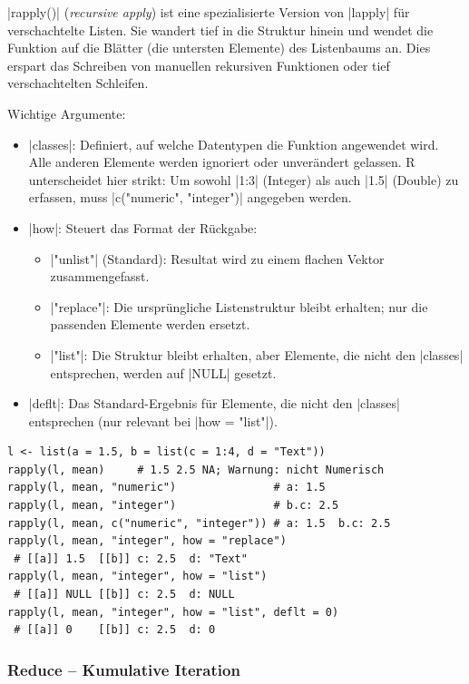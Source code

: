 \documentclass[10pt,twocolumn]{scrartcl}
\renewcommand{\lstinline}{\mycoloredinline}
\begin{document}
\lstinline|rapply()| (\emph{recursive apply}) ist eine spezialisierte Version von \lstinline|lapply| für verschachtelte Listen. Sie wandert tief in die Struktur hinein und wendet die Funktion auf die Blätter (die untersten Elemente) des Listenbaums an. Dies erspart das Schreiben von manuellen rekursiven Funktionen oder tief verschachtelten Schleifen.

Wichtige Argumente:

\begin{itemize}
\item \lstinline|classes|: Definiert, auf welche Datentypen die Funktion angewendet wird. Alle anderen Elemente werden ignoriert oder unverändert gelassen. R unterscheidet hier strikt: Um sowohl \lstinline|1:3| (Integer) als auch \lstinline|1.5| (Double) zu erfassen, muss \lstinline|c("numeric", "integer")| angegeben werden.
\item \lstinline|how|: Steuert das Format der Rückgabe:
  \begin{itemize}
  \item \lstinline|"unlist"| (Standard): Resultat wird zu einem flachen Vektor zusammengefasst.
  \item \lstinline|"replace"|: Die ursprüngliche Listenstruktur bleibt erhalten; nur die passenden Elemente werden ersetzt.
  \item \lstinline|"list"|: Die Struktur bleibt erhalten, aber Elemente, die nicht den \lstinline|classes| entsprechen, werden auf \lstinline|NULL| gesetzt.
  \end{itemize}
\item \lstinline|deflt|: Das Standard-Ergebnis für Elemente, die nicht den \lstinline|classes| entsprechen (nur relevant bei \lstinline|how = "list"|).
\end{itemize}

\begin{lstlisting}
l <- list(a = 1.5, b = list(c = 1:4, d = "Text"))
rapply(l, mean)     # 1.5 2.5 NA; Warnung: nicht Numerisch
rapply(l, mean, "numeric")               # a: 1.5
rapply(l, mean, "integer")               # b.c: 2.5
rapply(l, mean, c("numeric", "integer")) # a: 1.5  b.c: 2.5
rapply(l, mean, "integer", how = "replace")
 # [[a]] 1.5  [[b]] c: 2.5  d: "Text"
rapply(l, mean, "integer", how = "list")
 # [[a]] NULL [[b]] c: 2.5  d: NULL
rapply(l, mean, "integer", how = "list", deflt = 0)
 # [[a]] 0    [[b]] c: 2.5  d: 0
\end{lstlisting}


\subsubsection{Reduce -- Kumulative Iteration}
\end{document}
